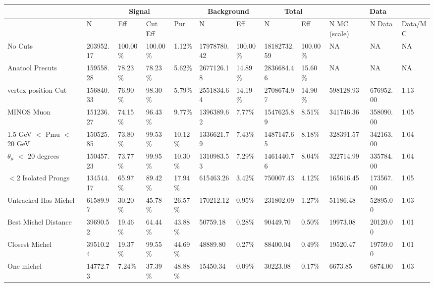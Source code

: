\begin{table}[!hbt]
    \tiny
    \centering
    \begin{tabular}{|*{12}{l|}}


    \hline
    & \multicolumn{4}{c|}{Signal} & \multicolumn{2}{c|}{Background} & \multicolumn{2}{c|}{Total} & \multicolumn{3}{c|}{Data} \\
    \hline
& N     & Eff     & Cut Eff & Pur    & N         & Eff     & N         & Eff     & N MC (scale) & N Data    & Data/MC \\\hline
 No Cuts   & 203952.17     & 100.00\% & 100.00\% &   1.12\% & 17978780.42 & 100.00\% & 18182732.59 & 100.00\% & NA & NA & NA \\ \hline
 Anatool Precuts   & 159558.28     &  78.23\% &  78.23\% &   5.62\% & 2677126.18 &  14.89\% & 2836684.46 &  15.60\% & NA & NA & NA \\ \hline
 vertex position Cut   & 156840.33     &  76.90\% &  98.30\% &   5.79\% & 2551834.64 &  14.19\% & 2708674.97     &  14.90\% & 598128.93     & 676952.00 &   1.13 \\ \hline
 MINOS Muon   & 151236.27     &  74.15\% &  96.43\% &   9.77\% & 1396389.62 &   7.77\% & 1547625.89     &   8.51\% & 341746.36     & 358090.00 &   1.05 \\ \hline
 1.5 GeV $<$ Pmu $<$ 20 GeV   & 150525.85     &  73.80\% &  99.53\% &  10.12\% & 1336621.79 &   7.43\% & 1487147.65     &   8.18\% & 328391.57     & 342163.00 &   1.04 \\ \hline
 $\theta_{\mu}$ $<$ 20 degrees   & 150457.23     &  73.77\% &  99.95\% &  10.30\% & 1310983.53 &   7.29\% & 1461440.76     &   8.04\% & 322714.99     & 335784.00 &   1.04 \\ \hline
 $<$2 Isolated Prongs   & 134544.17     &  65.97\% &  89.42\% &  17.94\% & 615463.26 &   3.42\% & 750007.43     &   4.12\% & 165616.45     & 173567.00 &   1.05 \\ \hline
 Untracked Has Michel   & 61589.97     &  30.20\% &  45.78\% &  26.57\% & 170212.12 &   0.95\% & 231802.09     &   1.27\% & 51186.48     & 52895.00 &   1.03 \\ \hline
 Best Michel Distance   & 39690.52     &  19.46\% &  64.44\% &  43.88\% & 50759.18 &   0.28\% & 90449.70     &   0.50\% & 19973.08     & 20120.00 &   1.01 \\ \hline
 Closest Michel   & 39510.24     &  19.37\% &  99.55\% &  44.69\% & 48889.80 &   0.27\% & 88400.04     &   0.49\% & 19520.47     & 19759.00 &   1.01 \\ \hline
 One michel   & 14772.73     &   7.24\% &  37.39\% &  48.88\% & 15450.34 &   0.09\% & 30223.08     &   0.17\% & 6673.85     & 6874.00 &   1.03 \\ \hline

\end{tabular}
\end{table}
